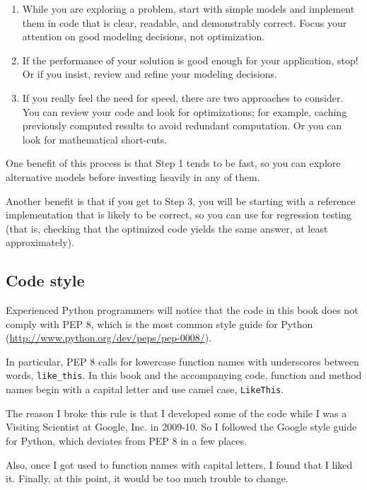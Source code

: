 \documentclass[12pt]{book}
\begin{document}
\begin{enumerate}

\item While you are exploring a problem, start with simple models
and implement them in code that is clear, readable, and demonstrably
correct.  Focus your attention on good modeling decisions, not
optimization.

\item If the performance of your solution is good enough for your
application, stop!  Or if you insist, review and refine your modeling
decisions.

\item If you really feel the need for speed, there are two approaches
to consider.  You can review your code and look for optimizations; for
example, caching previously computed results to avoid redundant
computation.  Or you can look for mathematical short-cuts.  

\end{enumerate}

One benefit of this process is that Step 1 tends to be fast, so
you can explore alternative models before investing heavily in
any of them.

Another benefit is that if you get to Step 3, you will be starting
with a reference implementation that is likely to be correct, so
you can use for regression testing (that is, checking that the
optimized code yields the same answer, at least approximately).


\subsection*{Code style}

Experienced Python programmers will notice that the code in this
book does not comply with PEP 8, which is the most common
style guide for Python (\url{http://www.python.org/dev/peps/pep-0008/}).

In particular, PEP 8 calls for lowercase function names with
underscores between words, \verb"like_this".  In this book and
the accompanying code, function and method names begin with
a capital letter and use camel case, \verb"LikeThis".

The reason I broke this rule is that I developed some of the
code while I was a Visiting Scientist at Google, Inc. in 2009-10.
So I followed the Google style guide for Python, which deviates
from PEP 8 in a few places.

Also, once I got used to function names with capital letters, I
found that I liked it.  Finally, at this point, it would be too
much trouble to change.
\end{document}
